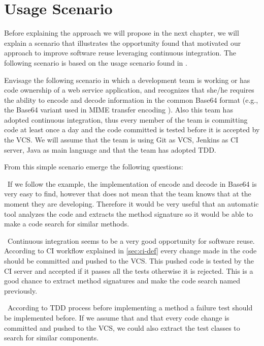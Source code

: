 \chapter{Usage Scenario}
\label{usage-scenario}
Before explaining the approach we will propose in the next chapter, we will explain a scenario that illustrates the opportunity found that motivated our approach to improve software reuse leveraging continuous integration. The following scenario is based on the usage scenario found in \cite{Kessel2016}.

Envisage the following scenario in which a development team is working or has code ownership of a web service application, and recognizes that she/he requires the ability to encode and decode information in the common Base64 format (e.g., the Base64 variant used in MIME transfer encoding \cite{rfc2045}). Also this team has adopted continuous integration, thus every member of the team is committing code at least once a day and the code committed is tested before it is accepted by the VCS. We will assume that the team is using Git as VCS, Jenkins as CI server, Java as main language and that the team has adopted TDD.

From this simple scenario emerge the following questions:

\begin{description}[style=nextline]
\item[How might the team realize that what they are working on has not been developed already?] \hfill \
If we follow the example, the implementation of encode and decode in Base64 is very easy to find, however that does not mean that the team knows that at the moment they are developing. Therefore it would be very useful that an automatic tool analyzes the code and extracts the method signature so it would be able to make a code search for similar methods.
\item[How might we seize continuous integration in order to improve software reuse?] \hfill \
Continuous integration seems to be a very good opportunity for software reuse. According to CI workflow explained in \ref{sec:ci-def} every change made in the code should be committed and pushed to the VCS. This pushed code is tested by the CI server and accepted if it passes all the tests otherwise it is rejected. This is a good chance to extract method signatures and make the code search named previously.
\item[Would TDD be helpful?] \hfill \
According to TDD process before implementing a method a failure test should be implemented before. If we assume that and that every code change is committed and pushed to the VCS, we could also extract the test classes to search for similar components.
\end{description}